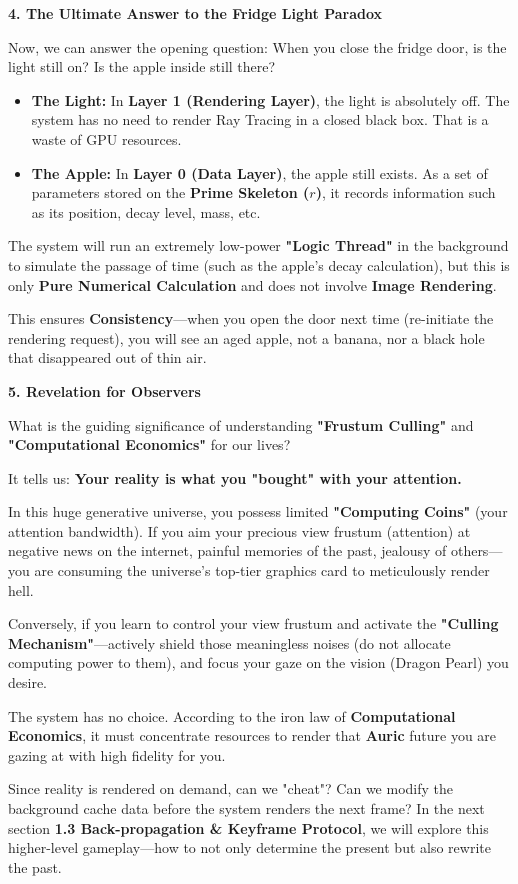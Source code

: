 \textbf{4. The Ultimate Answer to the Fridge Light Paradox}

Now, we can answer the opening question: When you close the fridge door, is the light still on? Is the apple inside still there?

\begin{itemize}
\item \textbf{The Light:} In \textbf{Layer 1 (Rendering Layer)}, the light is absolutely off. The system has no need to render Ray Tracing in a closed black box. That is a waste of GPU resources.
\item \textbf{The Apple:} In \textbf{Layer 0 (Data Layer)}, the apple still exists. As a set of parameters stored on the \textbf{Prime Skeleton ($r$)}, it records information such as its position, decay level, mass, etc.
\end{itemize}

The system will run an extremely low-power \textbf{"Logic Thread"} in the background to simulate the passage of time (such as the apple's decay calculation), but this is only \textbf{Pure Numerical Calculation} and does not involve \textbf{Image Rendering}.

This ensures \textbf{Consistency}—when you open the door next time (re-initiate the rendering request), you will see an aged apple, not a banana, nor a black hole that disappeared out of thin air.

\textbf{5. Revelation for Observers}

What is the guiding significance of understanding \textbf{"Frustum Culling"} and \textbf{"Computational Economics"} for our lives?

It tells us: \textbf{Your reality is what you "bought" with your attention.}

In this huge generative universe, you possess limited \textbf{"Computing Coins"} (your attention bandwidth).
If you aim your precious view frustum (attention) at negative news on the internet, painful memories of the past, jealousy of others—you are consuming the universe's top-tier graphics card to meticulously render hell.

Conversely, if you learn to control your view frustum and activate the \textbf{"Culling Mechanism"}—actively shield those meaningless noises (do not allocate computing power to them), and focus your gaze on the vision (Dragon Pearl) you desire.

The system has no choice.
According to the iron law of \textbf{Computational Economics}, it must concentrate resources to render that \textbf{Auric} future you are gazing at with high fidelity for you.

Since reality is rendered on demand, can we "cheat"? Can we modify the background cache data before the system renders the next frame?
In the next section \textbf{1.3 Back-propagation \& Keyframe Protocol}, we will explore this higher-level gameplay—how to not only determine the present but also rewrite the past.

